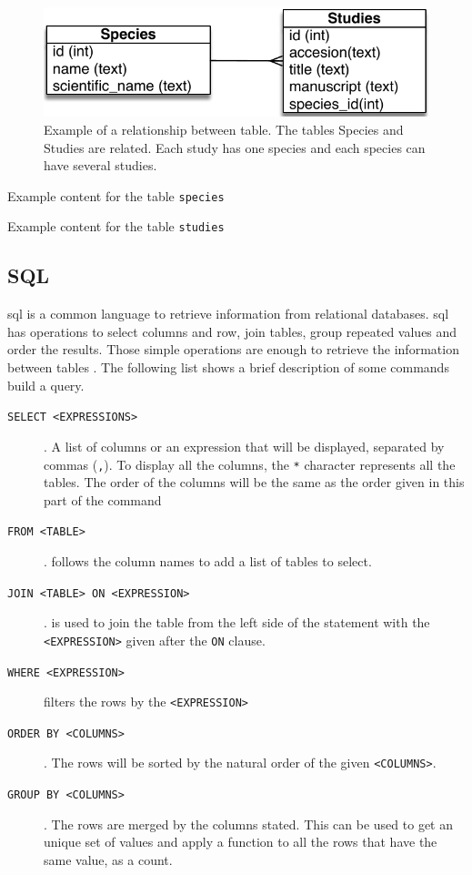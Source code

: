 \begin{figure}
\includegraphics{expVIP/Figures/miniER.pdf}
\caption[Example of a relationship between table.]{Example of a relationship between table. The tables Species and Studies are related. Each study has one species and each species can have several studies.}
\label{fig:expvip:miniER}
\end{figure}

\begin{table}
\caption[Species]{Example content for the table \texttt{species}}
\label{exp:tab:species}
\centering

\end{table}

\begin{table}
\caption[Studies]{Example content for the table \texttt{studies}}
\label{exp:tab:studies}
\centering

\end{table}

\subsection{SQL}
\gls{sql} is a common language to retrieve information from relational databases. 
\acrshort{sql} has operations to select columns and row, join tables, group repeated values and order the results. 
Those simple operations are enough to retrieve the information between tables \citep{Oracle2014}. 
The following list shows a brief description of some commands build a query.  

\begin{description}
\item[\texttt{SELECT <EXPRESSIONS> }]. A list of columns or an expression that will be displayed, separated by commas (\texttt{,}). To display all the columns, the \texttt{*} character represents all the tables. The order of the columns will be the same as the order given in this part of the command
\item[\texttt{FROM <TABLE>}]. follows the column names to add a list of tables to select.
\item[\texttt{JOIN <TABLE> ON <EXPRESSION> }]. is used to join the table from the left side of the statement with the \texttt{<EXPRESSION>} given after the \texttt{ON} clause.  
\item[\texttt{WHERE <EXPRESSION>}] filters the rows by the \texttt{<EXPRESSION>}
\item[\texttt{ORDER BY <COLUMNS>}]. The rows will be sorted by the natural order of the given \texttt{<COLUMNS>}.  
\item[\texttt{GROUP BY <COLUMNS>}]. The rows are merged by the columns stated. This can be used to get an unique set of values and apply a function to all the rows that have the same value, as a count.
\end{description} 

